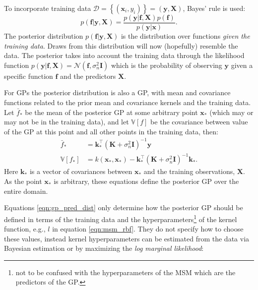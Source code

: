 To incorporate training data $\mathcal{D}=\left\{(\mathbf{x}_{i}, y_{i})\right\} = (\mathbf{y}, \mathbf{X})$, Bayes' rule is used: \cite{rasmussenGaussianProcessesMachine2006}
\begin{equation}\label{eqn:ya_boy_bayes}
    p(\mathbf{f}|\mathbf{y}, \mathbf{X})  = \frac{p(\mathbf{y}|\mathbf{f}, \mathbf{X})p(\mathbf{f})}{p(\mathbf{y}|\mathbf{x})}. 
\end{equation}
The posterior distribution $p(\mathbf{f}|\mathbf{y}, \mathbf{X})$ is the distribution over functions \emph{given the training data}.\cite{gelmanBayesianDataAnalysis2014} Draws from this distribution will now (hopefully) resemble the data. The posterior takes into account the training data  through the likelihood function $p(\mathbf{y}|\mathbf{f}, \mathbf{X}) = \mathcal{N}(\mathbf{f}, \sigma_{n}^{2}\mathbf{I})$ which is the probability of observing $\mathbf{y}$ given a specific function $\mathbf{f}$ and the predictors $\mathbf{X}$. \cite{gelmanBayesianDataAnalysis2014} 

For GPs the posterior distribution is also a GP, with mean and covariance functions related to the prior mean and covariance kernels and the training data.\cite{rasmussenGaussianProcessesMachine2006} Let $\bar{f}_{*}$ be the mean of the posterior GP at some arbitrary point $\mathbf{x}_{*}$ (which may or may not be in the training data), and let $\mathbb{V}\left[f\right]$ be the covariance between value of the GP at this point and all other points in the training data, then: \cite{rasmussenGaussianProcessesMachine2006} 
\begin{equation}\label{eqn:gp_pred_dist}
\begin{aligned}
\bar{f}_{*} &=\mathbf{k}_{*}^{\top}\left(\mathbf{K}+\sigma_{n}^{2} \mathbf{I}\right)^{-1} \mathbf{y} \\
\mathbb{V}\left[f_{*}\right] &=k\left(\mathbf{x}_{*}, \mathbf{x}_{*}\right)-\mathbf{k}_{*}^{\top}\left(\mathbf{K}+\sigma_{n}^{2} \mathbf{I}\right)^{-1} \mathbf{k}_{*}.
\end{aligned}
\end{equation}
Here $\mathbf{k}_{*}$ is a vector of covariances between $\mathbf{x}_{*}$ and the training observations, $\mathbf{X}$. As the point $\mathbf{x}_{*}$ is arbitrary, these equations define the posterior GP over the entire domain. 

Equations \ref{eqn:gp_pred_dist} only determine how the posterior GP should be defined in terms of the training data and the hyperparameters\footnote{not to be confused with the hyperparameters of the MSM which are the predictors of the GP.} of the kernel function, e.g., $l$ in equation \ref{eqn:msm_rbf}.  They do not specify how to choose these values, instead kernel hyperparameters can be estimated from the data via Bayesian estimation or by maximizing the \emph{log marginal likelihood}:\cite{rasmussenGaussianProcessesMachine2006}

